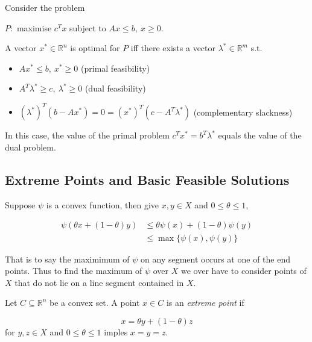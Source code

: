 \documentclass[a4paper]{article}
\begin{document}
\begin{thm}
  Consider the problem
  
  \begin{center}
    $P:$ maximise $c^T x$ subject to $Ax \leq b,\: x \geq 0$.
  \end{center}
  
  A vector $x^* \in \mathbb{R}^n$ is optimal for $P$ iff there exists a vector $\lambda^* \in \mathbb{R}^m$ s.t.

  \begin{itemize}
  \item $A x^* \leq b,\: x^* \geq 0$ \: (primal feasibility)
  \item $A^T \lambda^* \geq c,\: \lambda^* \geq 0$ \: (dual feasibility)
  \item $(\lambda^*)^T (b - A x^*) = 0 = (x^*)^T (c - A^T \lambda ^*)$ \: (complementary slackness)
  \end{itemize}
\end{thm}

In this case, the value of the primal problem $c^T x^* = b^T \lambda^*$ equals the value of the dual problem.

\subsection{Extreme Points and Basic Feasible Solutions}

Suppose $\psi$ is a convex function, then give $x, y \in X$ and $0 \leq \theta \leq 1$,

\begin{align*}
  \psi(\theta x + (1 - \theta) y) & \leq \theta \psi(x) + (1 - \theta)\psi(y) \\
                                  &\leq \max\{\psi(x), \psi(y)\}
\end{align*}

That is to say the maximimum of $\psi$ on any segment occurs at one of the end points. Thus to find the maximum of $\psi$ over $X$ we over have to consider points of $X$ that do not lie on a line segment contained in $X$.

\begin{defi}
  Let $C \subseteq \mathbb{R}^n$ be a convex set. A point $x \in C$ is an \emph{extreme point} if

  \[
    x = \theta y + (1 - \theta) z
  \]
  for $y, z \in X$ and $0 \leq \theta \leq 1$ imples $x = y = z$.
\end{defi}
\end{document}
